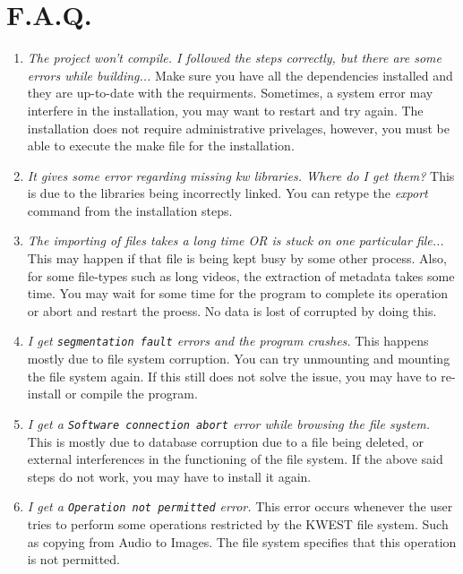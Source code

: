 \section{F.A.Q.}
\begin{enumerate} 
\item \emph{The project won't compile. I followed the steps correctly, but there are some errors while building...} \newline
Make sure you have all the dependencies installed and they are up-to-date with the requirments. Sometimes, a system error may interfere in the installation, you may want to restart and try again. The installation does not require administrative privelages, however, you must be able to execute the make file for the installation.
\item \emph{It gives some error regarding missing kw libraries. Where do I get them?} \newline
This is due to the libraries being incorrectly linked. You can retype the \textit{export} command from the installation steps.
\item \emph{The importing of files takes a long time OR is stuck on one particular file...} \newline
This may happen if that file is being kept busy by some other process. Also, for some file-types such as long videos, the extraction of metadata takes some time. You may wait for some time for the program to complete its operation or abort and restart the proess. No data is lost of corrupted by doing this.
\item \emph{I get \texttt{segmentation fault} errors and the program crashes.} \newline
This happens mostly due to file system corruption. You can try unmounting and mounting the file system again. If this still does not solve the issue, you may have to re-install or compile the program.
\item \emph{I get a \texttt{Software connection abort} error while browsing the file system.} \newline
This is mostly due to database corruption due to a file being deleted, or external interferences in the functioning of the file system. If the above said steps do not work, you may have to install it again.
\item \emph{I get a \texttt{Operation not permitted} error.} \newline
This error occurs whenever the user tries to perform some operations restricted by the KWEST file system. Such as copying from Audio to Images. The file system specifies that this operation is not permitted.

\end{enumerate}
